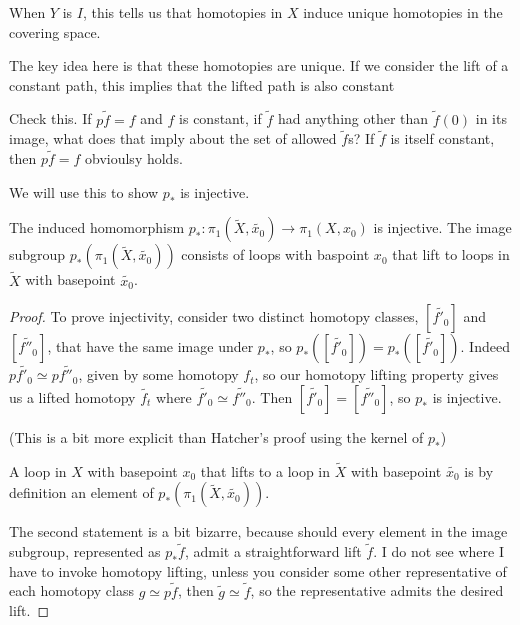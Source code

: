 \documentclass[10pt]{article}
\begin{document}
When $Y$ is $I$, this tells us that homotopies in $X$ induce unique homotopies
in the covering space.

The key idea here is that these homotopies are unique. If we consider the lift
of a constant path, this implies that the lifted path is also constant 

\begin{note}
Check this. If $p\tilde{f} = f$ and $f$ is constant, if $\tilde{f}$ had anything
other than $\tilde{f}(0)$ in its image, what does that imply about the set of
allowed $\tilde{f}$s? If $\tilde{f}$ is itself constant, then $p\tilde{f} = f$
obvioulsy holds. 
\end{note}

We will use this to show $p_*$ is injective.

\begin{proposition}
	The induced homomorphism $p_*: \pi_1(\tilde{X}, \tilde{x_0}) \to \pi_1(X,
	x_0)$ is injective. The image subgroup $p_*(\pi_1(\tilde{X}, \tilde{x_0}))$
	consists of loops with baspoint $x_0$ that lift to loops in $\tilde{X}$ with
	basepoint $\tilde{x_0}$.
\end{proposition}

\begin{proof}
	To prove injectivity, consider two distinct homotopy classes, $[\tilde{f'_0}]$
	and $[\tilde{f''_0}]$, that have the same image under $p_*$, so
	$p_*([\tilde{f'_0}]) = p_*([\tilde{f'_0}])$. Indeed $p\tilde{f'_0} \simeq
	p\tilde{f''_0}$, given by some homotopy $f_t$, so our homotopy lifting
	property gives us a lifted homotopy $\tilde{f_t}$ where $\tilde{f'_0} \simeq
	\tilde{f''_0}$. Then $[\tilde{f'_0}] = [\tilde{f''_0}]$, so $p_*$ is
	injective.

	(This is a bit more explicit than Hatcher's proof using the kernel of $p_*$)

	A loop in $X$ with basepoint $x_0$ that lifts to a loop in $\tilde{X}$ with
	basepoint $\tilde{x_0}$ is by definition an element of $p_*(\pi_1(\tilde{X},
	\tilde{x_0}))$.

	The second statement is a bit bizarre, because should every element in the
	image subgroup, represented as $p_*\tilde{f}$, admit a straightforward lift
	$\tilde{f}$. I do not see where I have to invoke homotopy lifting, unless you
	consider some other representative of each homotopy class $g \simeq
	p\tilde{f}$, then $\tilde{g} \simeq \tilde{f}$, so the representative admits
	the desired lift.
\end{proof}
\end{document}
